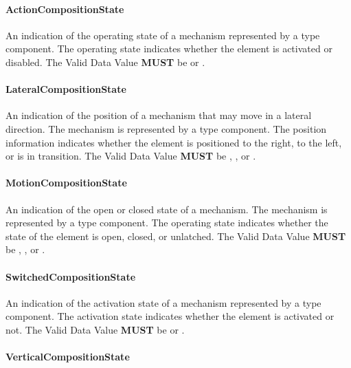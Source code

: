 \paragraph{ActionCompositionState}\mbox{}
\label{sec:ActionCompositionState}


An indication of the operating state of a mechanism represented by a  type component.
 The operating state indicates whether the  element is activated or disabled. 
 The \gls{Valid Data Value} \textbf{MUST} be  or .


\paragraph{LateralCompositionState}\mbox{}
\label{sec:LateralCompositionState}


An indication of the position of a mechanism that may move in a lateral direction.   The mechanism is represented by a  type component. 
 The position information indicates whether the  element is positioned to the right, to the left, or is in transition.  
 The \gls{Valid Data Value} \textbf{MUST} be , , or .


\paragraph{MotionCompositionState}\mbox{}
\label{sec:MotionCompositionState}


An indication of the open or closed state of a mechanism.   The mechanism is represented by a  type component. 
 The operating state indicates whether the state of the  element is open, closed, or unlatched.   
 The \gls{Valid Data Value} \textbf{MUST} be , , or .


\paragraph{SwitchedCompositionState}\mbox{}
\label{sec:SwitchedCompositionState}


An indication of the activation state of a mechanism represented by a  type component.
 The activation state indicates whether the  element is activated or not.
 The \gls{Valid Data Value} \textbf{MUST} be  or .


\paragraph{VerticalCompositionState}\mbox{}
\label{sec:VerticalCompositionState}


